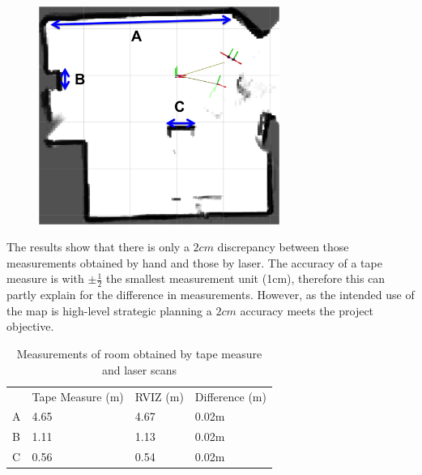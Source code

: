 \documentclass[capstone_report.tex]{subfiles}
\begin{document}
\begin{figure}[H]
    \centering
        \centering
        \includegraphics[width=0.7\textwidth]{./imgs/map_measured.png}
        \caption{}
        \label{fig:measure}
\end{figure}
The results show that there is only a $2cm$ discrepancy between those measurements obtained by hand and those by laser.  The accuracy of a tape measure is with $\pm \frac{1}{2}$ the smallest measurement unit (1cm), therefore this can partly explain for the difference in measurements.  However, as the intended use of the map is high-level strategic planning a $2cm$ accuracy meets the project objective.
\begin{table}[H]
\centering
\begin{tabular}{llll}
& Tape Measure (m) & RVIZ (m) & Difference (m) \\
A                & 4.65     & 4.67           & 0.02m \\
B                & 1.11     & 1.13           & 0.02m \\
C                & 0.56     & 0.54           & 0.02m
\end{tabular}
\caption{Measurements of room obtained by tape measure and laser scans}
\label{table:measure}
\end{table}
\end{document}
